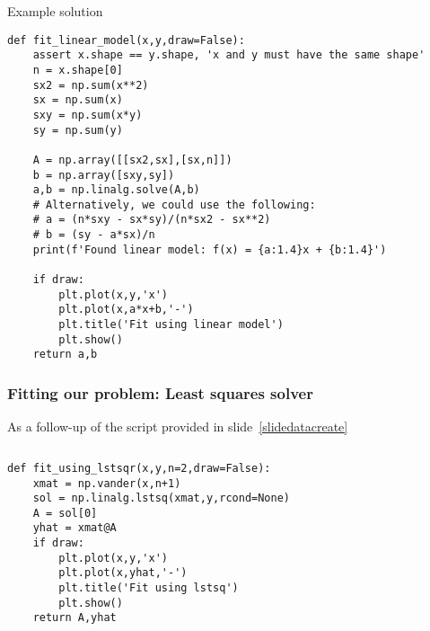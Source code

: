 \begin{frame}[fragile]{Example solution}
    \begin{lstlisting}
def fit_linear_model(x,y,draw=False):
    assert x.shape == y.shape, 'x and y must have the same shape'
    n = x.shape[0]
    sx2 = np.sum(x**2)
    sx = np.sum(x)
    sxy = np.sum(x*y)
    sy = np.sum(y)

    A = np.array([[sx2,sx],[sx,n]])
    b = np.array([sxy,sy])
    a,b = np.linalg.solve(A,b)
    # Alternatively, we could use the following:
    # a = (n*sxy - sx*sy)/(n*sx2 - sx**2)
    # b = (sy - a*sx)/n
    print(f'Found linear model: f(x) = {a:1.4}x + {b:1.4}')
    
    if draw:
        plt.plot(x,y,'x')
        plt.plot(x,a*x+b,'-')
        plt.title('Fit using linear model')
        plt.show()
    return a,b
    \end{lstlisting}
\end{frame}



\begin{frame}[fragile] 
  \frametitle{Fitting our problem: Least squares solver}
  As a follow-up of the script provided in slide~\ref{slidedatacreate}
  \begin{columns}[T]
    \begin{lstlisting}
def fit_using_lstsqr(x,y,n=2,draw=False):
    xmat = np.vander(x,n+1)
    sol = np.linalg.lstsq(xmat,y,rcond=None)
    A = sol[0]
    yhat = xmat@A
    if draw:
        plt.plot(x,y,'x')
        plt.plot(x,yhat,'-')
        plt.title('Fit using lstsq')
        plt.show()
    return A,yhat
    \end{lstlisting}
      
  \end{columns}
\end{frame}


